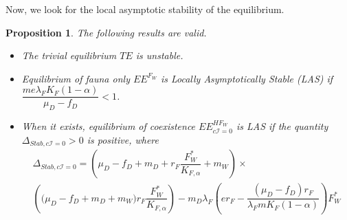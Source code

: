 \documentclass{article}
\newcommand{\lfw}{\lambda_{F}}
\newcommand{\lfw}{\lambda_{F}}
\newcommand{\cI}{c \mathcal{I}}
\newtheorem{prop}{Proposition}
\begin{document}
Now, we look for the local asymptotic stability of the equilibrium.

\begin{prop}\label{propLAS, cI=0} The following results are valid.
\begin{itemize}
\item The trivial equilibrium $TE$ is unstable.
\item Equilibrium of fauna only $EE^{F_W}$ is Locally Asymptotically Stable (LAS) if $\dfrac{m e \lfw K_F(1-\alpha)}{\mu_D - f_D} < 1 $.
\item When it exists, equilibrium of coexistence $EE^{HF_W}_{\cI =0}$ is LAS if the quantity $\Delta_{Stab, \cI =0} > 0$ is positive, where
\begin{multline*}
\Delta_{Stab, \cI=0} = \left(\mu_D -f_D + m_D + r_F \dfrac{F_W^*}{K_{F, \alpha}} + m_W\right) \times \\
\left(\big( \mu_D -f_D + m_D + m_W) r_F \dfrac{F^*_W}{K_{F, \alpha}} \right) - m_D \lfw \left(er_F - \dfrac{(\mu_D - f_D) r_F}{\lfw m K_F(1-\alpha)}\right)  F^*_{W} 
\end{multline*}
\end{itemize}
\end{prop}
\end{document}
